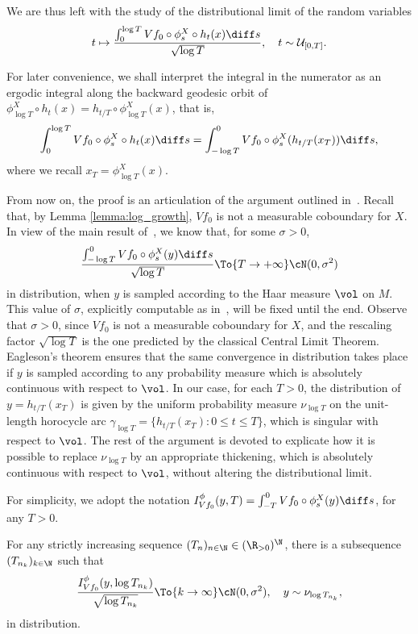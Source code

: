 \begin{appendix}
We are thus left with the study of the distributional limit of the random variables
\begin{equation*}
t\mapsto \frac{\int_0^{\log{T}}Vf_0\circ \phi^{X}_s\circ h_t(x) \diff s}{\sqrt{\log{T}}}, \quad t\sim \mathcal{U}_{[0,T]}.
\end{equation*}

For later convenience, we shall interpret the integral in the numerator as an ergodic integral along the backward geodesic orbit of $\phi_{\log{T}}^{X}\circ h_t(x)=h_{t/T} \circ \phi^{X}_{\log{T}}(x)$, that is,
\begin{equation*}
\int_0^{\log{T}}Vf_0\circ \phi^{X}_s\circ h_t(x) \diff s=\int_{-\log{T}}^{0}Vf_0\circ \phi_s^{X}(h_{t/T}(x_T))\diff s,
\end{equation*}
where we recall $x_T =\phi^{X}_{\log{T}}(x)$.

From now on, the proof is an articulation of the argument outlined in~\cite{Dolgopyat-Sarig}. Recall that, by Lemma \ref{lemma:log_growth}, $Vf_0$ is not a measurable coboundary for $X$. In view of the main result of~\cite{Rat:CLT}, we know that, for some $\sigma >0$,
\begin{equation*}
\frac{\int_{-\log{T}}^{0}Vf_0\circ \phi^{X}_s(y)\diff s}{\sqrt{\log{T}}}\To{T\to+\infty}\cN(0,\sigma^{2})
\end{equation*}
in distribution, when $y$ is sampled according to the Haar measure $\vol$ on $M$. This value of $\sigma$, explicitly computable as in~\cite[Th.\,3.1]{Rat:CLT}, will be fixed until the end.
Observe that $\sigma >0$, since $Vf_0$ is not a measurable coboundary for $X$, and the rescaling factor $\sqrt{\log T}$ is the one predicted by the classical Central Limit Theorem.
Eagleson's theorem \cite{Eagleson} ensures that the same convergence in distribution takes place if $y$ is sampled according to any probability measure which is absolutely continuous with respect to $\vol$. In our case, for each $T>0$, the distribution of $y=h_{t/T}(x_T)$ is given by the uniform probability measure $\nu_{\log{T}}$ on the unit-length horocycle arc $\gamma_{\log{T}}=\{h_{t/T}(x_T):0\leq t\leq T \}$, which is singular with respect to $\vol$. The rest of the argument is devoted to explicate how it is possible to replace $\nu_{\log{T}}$ by an appropriate thickening, which is absolutely continuous with respect to $\vol$, without altering the distributional limit.

For simplicity, we adopt the notation $I_{Vf_0}^{\phi}(y,T)=\int_{-T}^{0}Vf_0\circ \phi^{X}_s(y)\diff s$, for any $T>0$.
\begin{proposition}
\label{thickeningtrick}
For any strictly increasing sequence $(T_n)_{n\in \N}\in (\R_{>0})^{\N}$, there is a subsequence $(T_{n_k})_{k\in \N}$ such that
\begin{equation*}
\frac{I^{\phi}_{Vf_0}(y,\log{T_{n_k}})}{\sqrt{\log{T_{n_k}}}}\To{k\to\infty}\cN(0,\sigma^{2}), \quad y\sim \nu_{\log{T_{n_k}}},
\end{equation*}
in distribution.
\end{proposition}


\end{appendix}
